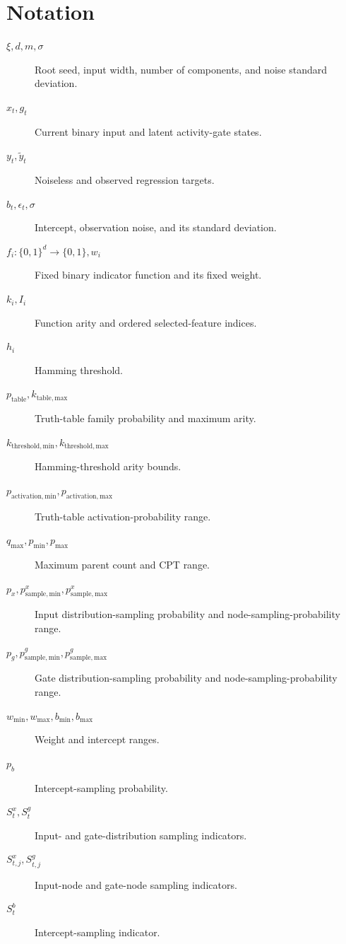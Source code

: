\documentclass[11pt]{article}
\begin{document}
\section{Notation}
\begin{description}
  \item[$\xi,d,m,\sigma$] Root seed, input width, number of components, and noise standard deviation.
  \item[$x_t,g_t$] Current binary input and latent activity-gate states.
  \item[$y_t,\tilde y_t$] Noiseless and observed regression targets.
  \item[$b_t,\epsilon_t,\sigma$] Intercept, observation noise, and its standard deviation.
  \item[$f_i:\{0,1\}^d\to\{0,1\},w_i$] Fixed binary indicator function and its fixed weight.
  \item[$k_i,I_i$] Function arity and ordered selected-feature indices.
  \item[$h_i$] Hamming threshold.
  \item[$p_{\mathrm{table}},k_{\mathrm{table,max}}$] Truth-table family probability and maximum arity.
  \item[$k_{\mathrm{threshold,min}},k_{\mathrm{threshold,max}}$] Hamming-threshold arity bounds.
  \item[$p_{\mathrm{activation,min}},p_{\mathrm{activation,max}}$] Truth-table activation-probability range.
  \item[$q_{\max},p_{\min},p_{\max}$] Maximum parent count and CPT range.
  \item[$p_x,p_{\mathrm{sample,min}}^x,p_{\mathrm{sample,max}}^x$] Input distribution-sampling probability and node-sampling-probability range.
  \item[$p_g,p_{\mathrm{sample,min}}^g,p_{\mathrm{sample,max}}^g$] Gate distribution-sampling probability and node-sampling-probability range.
  \item[$w_{\min},w_{\max},b_{\min},b_{\max}$] Weight and intercept ranges.
  \item[$p_b$] Intercept-sampling probability.
  \item[$S_t^x,S_t^g$] Input- and gate-distribution sampling indicators.
  \item[$S_{t,j}^x,S_{t,j}^g$] Input-node and gate-node sampling indicators.
  \item[$S_t^b$] Intercept-sampling indicator.
\end{description}
\end{document}
